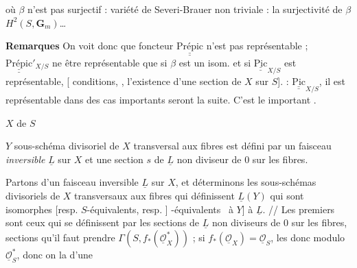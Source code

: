 \documentclass[11pt,a4paper]{article}
\begin{document}
\textbf{} où $\beta$ n'est pas surjectif : variété de Severi-Brauer non triviale \ill{} \ill{} \ill{} \ill{} \ill{} \ill{} \ill{} \ill{} \ill{} \ill{} \ill{} \ill{} \ill{}  : la surjectivité de $\beta$ \ill{} \ill{} \ill{} \ill{} \ill{} $H^{2}(S, \mathbf{G}_{m})$…

\textbf{Remarques} On voit donc que  foncteur $\underline{\underline{\text{Prépic}}}$ n'est \add{\ill{} \ill{} \ill{} \ill{}} pas représentable   \ill{}  \ill{} \ill{} ; $\underline{\underline{\text{Prépic}}}'_{X/S}$ ne \ill{} \ill{} être représentable que si $\beta$ est un isom. et si $\underline{\underline{\mathrm{Pic}}}_{X/S}$ est représentable,  \struck{\ill{}} [\ill{} \ill{} \ill{} \ill{}  \ill{} \ill{}  conditions, \ill{} \ill{} \ill{} \ill{}, \ill{} \ill{} l'existence d'une section de $X$ sur $S$].  : $\underline{\underline{\mathrm{Pic}}}_{X/S}$, il est représentable dans des cas  importants  seront   la suite. C'est \ill{} \ill{} \ill{} le  important  \ill{} .

$X$  \ill{} \ill{} de $S$

$Y$ sous-schéma divisoriel de $X$ transversal aux fibres est défini par un faisceau \emph{inversible} $\underline{L}$ sur $X$ et une section $s$ de $\underline{L}$ \struck{\ill{}} non diviseur de 0 sur les fibres.

Partons d'un faisceau inversible $\underline{L}$ sur $X$, et déterminons les  sous-schémas divisoriels de $X$ transversaux aux fibres qui définissent \ill{} $\underline{L}(Y)$ \struck{\ill{}} qui sont \struck{\ill{} \ill{}}
\struck{\ill{} \ill{}} isomorphes [resp. $S$-équivalents, resp.
] \struck{\ill{}} -équivalents \ à $Y$]
à $\underline{L}$. // Les premiers sont ceux qui se définissent par les sections de $\underline{L}$ non diviseurs de 0 sur les fibres, sections qu'il faut prendre 
$\Gamma(S, f_{*}(\underline{\mathcal{O}}_{X}^{*}))$ ; si $f_{*}(\underline{\mathcal{O}}_{X}) = \underline{\mathcal{O}}_{S}$, \ill{} les \ill{} donc modulo $\underline{\mathcal{O}}_{S}^{*}$, donc on \ill{} la    d'une \ill{}
\end{document}
